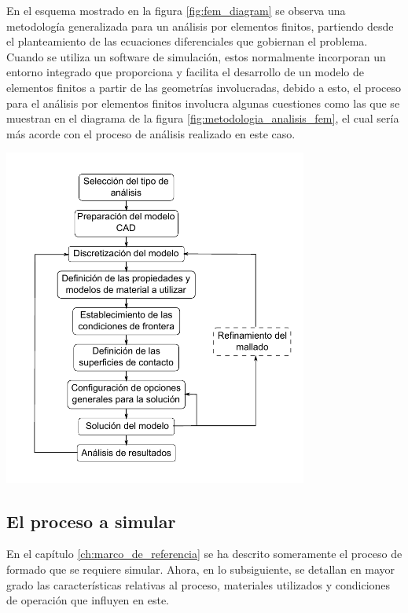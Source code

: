 En el esquema mostrado en la figura \ref{fig:fem_diagram} se observa una metodología generalizada 
para un análisis por elementos finitos, partiendo desde el planteamiento de las 
ecuaciones diferenciales que gobiernan el problema. Cuando se utiliza un software 
de simulación, estos normalmente incorporan un entorno integrado que 
proporciona y facilita el desarrollo de un modelo de elementos finitos a partir 
de las geometrías involucradas, debido a esto, el proceso para el análisis por elementos 
finitos involucra algunas cuestiones como las que se muestran en el diagrama de 
la figura \ref{fig:metodologia_analisis_fem}, el cual sería más acorde con 
el proceso de análisis realizado en este caso.

\begin{center}
\includegraphics[width=0.75\textwidth]{src/ch3/metodologia_analisis_fem.pdf}
\label{fig:metodologia_analisis_fem}
\end{center}

\subsection{El proceso a simular}

En el capítulo \ref{ch:marco_de_referencia} se ha descrito someramente el proceso de formado que se requiere 
simular. Ahora, en lo subsiguiente, se detallan en mayor grado las características 
relativas al proceso, materiales utilizados y condiciones de operación que influyen en este. \\

